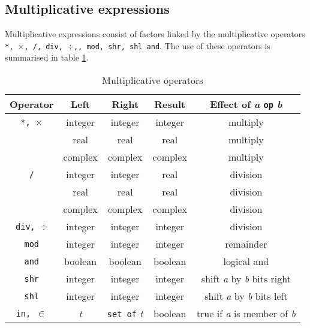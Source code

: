 {\subsection{Multiplicative expressions}

Multiplicative expressions consist of factors linked by the multiplicative operators
\texttt{{*}, $\times$, /, div, $\div$,, mod, shr, shl
and}. The use of these operators is summarised in table \ref{multop}.


\begin{table}

\caption{Multiplicative operators\label{multop}}
{\centering \begin{tabular}{ccccc}
{\small Operator}&
{\small Left}&
{\small Right}&
{\small Result}&
{\small Effect of} \emph{\small a} \texttt{\small op} \emph{\small b}{\small }\\
\hline 
\texttt{\small {*}, $\times$}{\small }&
{\small integer}&
{\small integer}&
{\small integer}&
{\small multiply}\\
{\small }&
{\small real}&
{\small real}&
{\small real}&
{\small multiply}\\
{\small }&
{\small complex}&
{\small complex}&
{\small complex}&
{\small multiply}\\
\texttt{\small /}{\small }&
{\small integer}&
{\small integer}&
{\small real}&
{\small division}\\
{\small }&
{\small real}&
{\small real}&
{\small real}&
{\small division}\\
{\small }&
{\small complex}&
{\small complex}&
{\small complex}&
{\small division}\\
\texttt{\small div, $\div$}{\small }&
{\small integer}&
{\small integer}&
{\small integer}&
{\small division}\\
\texttt{\small mod}{\small }&
{\small integer}&
{\small integer}&
{\small integer}&
{\small remainder}\\
\texttt{\small and}{\small }&
{\small boolean}&
{\small boolean}&
{\small boolean}&
{\small logical and}\\
\texttt{\small shr}{\small }&
{\small integer}&
{\small integer}&
{\small integer}&
{\small shift} \emph{\small a} {\small by} \emph{\small b} {\small bits right}\\
\texttt{\small shl}{\small }&
{\small integer}&
{\small integer}&
{\small integer}&
{\small shift} \emph{\small a} {\small by} \emph{\small b} {\small bits left}\\
\texttt{\small in, $\in$}{\small }&
\emph{\small t}{\small }&
\texttt{\small set of} \emph{\small t}{\small }&
{\small boolean}&
{\small true if} \emph{\small a} {\small is member of} \emph{\small b}\\
\hline 
\end{tabular}\small \par}\end{table}


}
